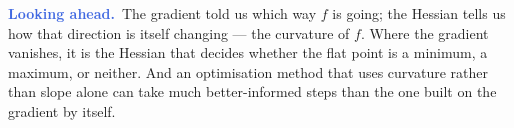 \documentclass[11pt]{article}
\theoremstyle{plain}
\theoremstyle{definition}
\theoremstyle{remark}
\newcommand{\lookahead}{\par\smallskip\noindent
  \textbf{\sffamily\textcolor{RoyalBlue}{Looking ahead.}}\ \ignorespaces}
\begin{document}
\lookahead The gradient told us which way $f$ is going; the Hessian tells us how
that direction is itself changing --- the curvature of $f$. Where the gradient
vanishes, it is the Hessian that decides whether the flat point is a minimum, a
maximum, or neither. And an optimisation method that uses curvature rather than
slope alone can take much better-informed steps than the one built on the
gradient by itself.
\end{document}
